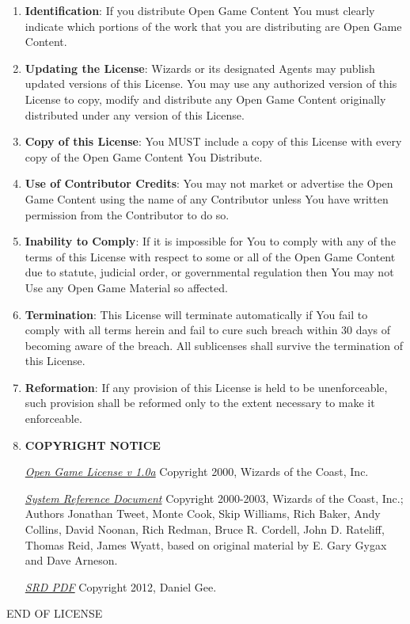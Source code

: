 \begin{small}
\begin{enumerate}
\item \textbf{Identification}: If you distribute Open Game Content You must clearly indicate which portions of the work that you are distributing are Open Game Content. 

\item \textbf{Updating the License}: Wizards or its designated Agents may publish updated versions of this License. You may use any authorized version of this License to copy, modify and distribute any Open Game Content originally distributed under any version of this License. 

\item \textbf{Copy of this License}: You MUST include a copy of this License with every copy of the Open Game Content You Distribute. 

\item \textbf{Use of Contributor Credits}: You may not market or advertise the Open Game Content using the name of any Contributor unless You have written permission from the Contributor to do so. 

\item \textbf{Inability to Comply}: If it is impossible for You to comply with any of the terms of this License with respect to some or all of the Open Game Content due to statute, judicial order, or governmental regulation then You may not Use any Open Game Material so affected. 

\item \textbf{Termination}: This License will terminate automatically if You fail to comply with all terms herein and fail to cure such breach within 30 days of becoming aware of the breach. All sublicenses shall survive the termination of this License. 

\item \textbf{Reformation}: If any provision of this License is held to be unenforceable, such provision shall be reformed only to the extent necessary to make it enforceable. 

\item \textbf{COPYRIGHT NOTICE}

\href{http://www.wizards.com/default.asp?x=d20/oglfaq/20040123f}{\textit{Open Game License v 1.0a}} Copyright 2000, Wizards of the Coast, Inc. 

\href{http://www.wizards.com/default.asp?x=d20/article/srd35}{\textit{System Reference Document}} Copyright 2000-2003, Wizards of the Coast, Inc.; Authors Jonathan Tweet, Monte Cook, Skip Williams, Rich Baker, Andy Collins, David Noonan, Rich Redman, Bruce R. Cordell, John D. Rateliff, Thomas Reid, James Wyatt, based on original material by E. Gary Gygax and Dave Arneson.

\href{https://sites.google.com/site/lokathorgames/srd-pdf}{\textit{SRD PDF}} Copyright 2012, Daniel Gee.
\end{enumerate}

END OF LICENSE

\end{small}